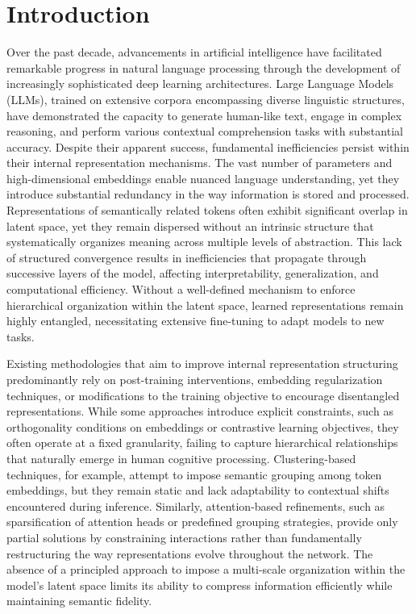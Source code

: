 \documentclass[5p,times]{elsarticle}
\begin{document}
\section{Introduction}

Over the past decade, advancements in artificial intelligence have facilitated remarkable progress in natural language processing through the development of increasingly sophisticated deep learning architectures. Large Language Models (LLMs), trained on extensive corpora encompassing diverse linguistic structures, have demonstrated the capacity to generate human-like text, engage in complex reasoning, and perform various contextual comprehension tasks with substantial accuracy. Despite their apparent success, fundamental inefficiencies persist within their internal representation mechanisms. The vast number of parameters and high-dimensional embeddings enable nuanced language understanding, yet they introduce substantial redundancy in the way information is stored and processed. Representations of semantically related tokens often exhibit significant overlap in latent space, yet they remain dispersed without an intrinsic structure that systematically organizes meaning across multiple levels of abstraction. This lack of structured convergence results in inefficiencies that propagate through successive layers of the model, affecting interpretability, generalization, and computational efficiency. Without a well-defined mechanism to enforce hierarchical organization within the latent space, learned representations remain highly entangled, necessitating extensive fine-tuning to adapt models to new tasks.

Existing methodologies that aim to improve internal representation structuring predominantly rely on post-training interventions, embedding regularization techniques, or modifications to the training objective to encourage disentangled representations. While some approaches introduce explicit constraints, such as orthogonality conditions on embeddings or contrastive learning objectives, they often operate at a fixed granularity, failing to capture hierarchical relationships that naturally emerge in human cognitive processing. Clustering-based techniques, for example, attempt to impose semantic grouping among token embeddings, but they remain static and lack adaptability to contextual shifts encountered during inference. Similarly, attention-based refinements, such as sparsification of attention heads or predefined grouping strategies, provide only partial solutions by constraining interactions rather than fundamentally restructuring the way representations evolve throughout the network. The absence of a principled approach to impose a multi-scale organization within the model’s latent space limits its ability to compress information efficiently while maintaining semantic fidelity.
\end{document}
